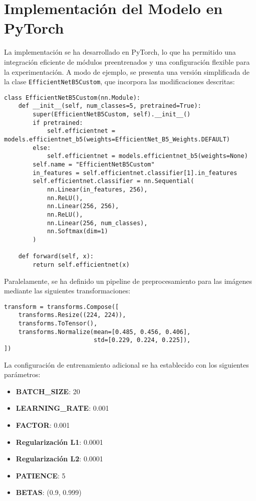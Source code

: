 \documentclass[11pt,spanish,listoffigures,listoftables]{tfgetsinf}
\begin{document}
\section{Implementación del Modelo en PyTorch}
La implementación se ha desarrollado en PyTorch, lo que ha permitido una integración eficiente de módulos preentrenados y una configuración flexible para la experimentación. A modo de ejemplo, se presenta una versión simplificada de la clase \texttt{EfficientNetB5Custom}, que incorpora las modificaciones descritas:

\begin{verbatim}
class EfficientNetB5Custom(nn.Module):
    def __init__(self, num_classes=5, pretrained=True):
        super(EfficientNetB5Custom, self).__init__()
        if pretrained:
            self.efficientnet = models.efficientnet_b5(weights=EfficientNet_B5_Weights.DEFAULT)
        else:
            self.efficientnet = models.efficientnet_b5(weights=None)
        self.name = "EfficientNetB5Custom"
        in_features = self.efficientnet.classifier[1].in_features
        self.efficientnet.classifier = nn.Sequential(
            nn.Linear(in_features, 256),
            nn.ReLU(),
            nn.Linear(256, 256),
            nn.ReLU(),
            nn.Linear(256, num_classes),
            nn.Softmax(dim=1)
        )
    
    def forward(self, x):
        return self.efficientnet(x)
\end{verbatim}

Paralelamente, se ha definido un pipeline de preprocesamiento para las imágenes mediante las siguientes transformaciones:

\begin{verbatim}
transform = transforms.Compose([
    transforms.Resize((224, 224)),
    transforms.ToTensor(),
    transforms.Normalize(mean=[0.485, 0.456, 0.406], 
                         std=[0.229, 0.224, 0.225]),
])
\end{verbatim}

La configuración de entrenamiento adicional se ha establecido con los siguientes parámetros:
\begin{itemize}
    \item \textbf{BATCH\_SIZE}: 20
    \item \textbf{LEARNING\_RATE}: 0.001
    \item \textbf{FACTOR}: 0.001
    \item \textbf{Regularización L1}: 0.0001
    \item \textbf{Regularización L2}: 0.0001
    \item \textbf{PATIENCE}: 5
    \item \textbf{BETAS}: (0.9, 0.999)
\end{itemize}
\end{document}
